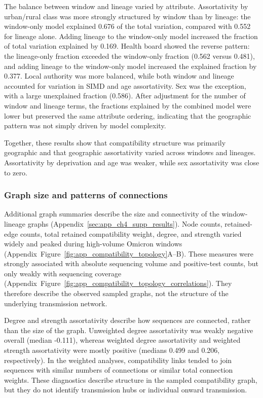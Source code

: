 The balance between window and lineage varied by attribute. Assortativity by urban/rural class was more strongly structured by window than by lineage: the window-only model explained 0.676 of the total variation, compared with 0.552 for lineage alone. Adding lineage to the window-only model increased the fraction of total variation explained by 0.169. Health board showed the reverse pattern: the lineage-only fraction exceeded the window-only fraction (0.562 versus 0.481), and adding lineage to the window-only model increased the explained fraction by 0.377. Local authority was more balanced, while both window and lineage accounted for variation in SIMD and age assortativity. Sex was the exception, with a large unexplained fraction (0.586). After adjustment for the number of window and lineage terms, the fractions explained by the combined model were lower but preserved the same attribute ordering, indicating that the geographic pattern was not simply driven by model complexity.

Together, these results show that compatibility structure was primarily geographic and that geographic assortativity varied across windows and lineages. Assortativity by deprivation and age was weaker, while sex assortativity was close to zero.

\subsubsection*{Graph size and patterns of connections}\label{sec:ch4_topology}

Additional graph summaries describe the size and connectivity of the window-lineage graphs (Appendix~\ref{sec:app_ch4_supp_results}). Node counts, retained-edge counts, total retained compatibility weight, degree, and strength varied widely and peaked during high-volume Omicron windows (Appendix~Figure~\ref{fig:app_compatibility_topology}A--B). These measures were strongly associated with absolute sequencing volume and positive-test counts, but only weakly with sequencing coverage (Appendix~Figure~\ref{fig:app_compatibility_topology_correlations}). They therefore describe the observed sampled graphs, not the structure of the underlying transmission network.%

Degree and strength assortativity describe how sequences are connected, rather than the size of the graph. Unweighted degree assortativity was weakly negative overall (median -0.111), whereas weighted degree assortativity and weighted strength assortativity were mostly positive (medians 0.499 and 0.206, respectively). In the weighted analyses, compatibility links tended to join sequences with similar numbers of connections or similar total connection weights. These diagnostics describe structure in the sampled compatibility graph, but they do not identify transmission hubs or individual onward transmission.

